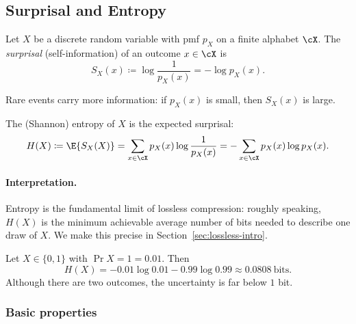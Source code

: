 
\subsection{Surprisal and Entropy}
\label{sec:entropy-entropy}

\begin{definition}
Let $X$ be a discrete random variable with pmf $p_X$ on a finite alphabet $\cX$.
The \emph{surprisal} (self-information) of an outcome $x\in\cX$ is
\begin{equation}
    S_X(x) \coloneqq \log\frac{1}{p_X(x)} = -\log p_X(x).
\end{equation}
\end{definition}

Rare events carry more information: if $p_X(x)$ is small, then $S_X(x)$ is large.

\begin{definition}[Entropy]
The (Shannon) entropy of $X$ is the expected surprisal:
\begin{equation}
    H(X)
    \coloneqq \E{S_X(X)}
    = \sum_{x\in\cX} p_X(x)\log\frac{1}{p_X(x)}
    = -\sum_{x\in\cX} p_X(x)\log p_X(x).
\end{equation}
\end{definition}

\paragraph{Interpretation.}
Entropy is the fundamental limit of lossless compression: roughly speaking, $H(X)$ is the minimum achievable average number of bits needed to describe one draw of $X$.
We make this precise in Section~\ref{sec:lossless-intro}.

\begin{example}
Let $X\in\{0,1\}$ with $\Pr{X=1}=0.01$.
Then
\[
H(X)= -0.01\log 0.01 - 0.99\log 0.99 \approx 0.0808\ \text{bits}.
\]
Although there are two outcomes, the uncertainty is far below $1$ bit.
\end{example}

\subsubsection*{Basic properties}

